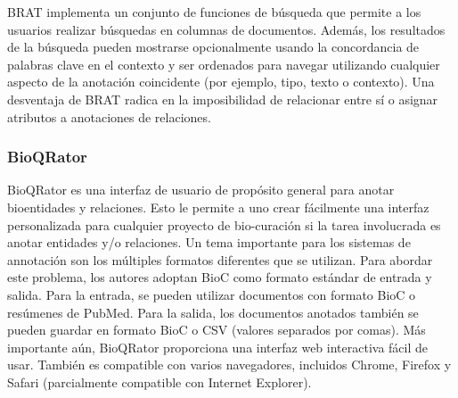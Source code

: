 BRAT implementa un conjunto de funciones de búsqueda que permite a los usuarios realizar búsquedas en columnas de documentos.
Además, los resultados de la búsqueda pueden mostrarse opcionalmente usando la concordancia de palabras clave en el contexto y ser ordenados para navegar utilizando cualquier aspecto de la anotación coincidente (por ejemplo, tipo, texto o contexto).
Una desventaja de BRAT radica en la imposibilidad de relacionar entre sí o asignar atributos a anotaciones de relaciones.

\subsubsection*{BioQRator}

BioQRator es una interfaz de usuario de propósito general para anotar bioentidades y relaciones.
Esto le permite a uno crear fácilmente una interfaz personalizada para cualquier proyecto de bio-curación si la tarea involucrada es anotar entidades y/o relaciones.
Un tema importante para los sistemas de annotación son los múltiples formatos diferentes que se utilizan.
Para abordar este problema, los autores adoptan BioC como formato estándar de entrada y salida.
Para la entrada, se pueden utilizar documentos con formato BioC o resúmenes de PubMed.
Para la salida, los documentos anotados también se pueden guardar en formato BioC o CSV (valores separados por comas). Más importante aún, BioQRator proporciona una interfaz web interactiva fácil de usar.
También es compatible con varios navegadores, incluidos Chrome, Firefox y Safari (parcialmente compatible con Internet Explorer).


